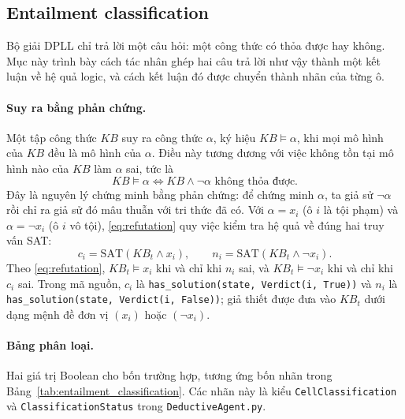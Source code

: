 \subsection{Entailment classification}
\label{sec:entailment_classification}
\begin{sloppypar}

Bộ giải DPLL chỉ trả lời một câu hỏi: một công thức có thỏa được hay không.
Mục này trình bày cách tác nhân ghép hai câu trả lời như vậy thành một kết luận
về hệ quả logic, và cách kết luận đó được chuyển thành nhãn của từng ô.

\paragraph{Suy ra bằng phản chứng.}
Một tập công thức $\mathit{KB}$ suy ra công thức $\alpha$, ký hiệu
$\mathit{KB} \models \alpha$, khi mọi mô hình của $\mathit{KB}$ đều là mô hình
của $\alpha$. Điều này tương đương với việc không tồn tại mô hình nào của
$\mathit{KB}$ làm $\alpha$ sai, tức là
\begin{equation}
  \mathit{KB} \models \alpha
  \iff
  \mathit{KB} \land \neg\alpha \text{ không thỏa được}.
  \label{eq:refutation}
\end{equation}
Đây là nguyên lý chứng minh bằng phản chứng: để chứng minh $\alpha$, ta giả sử
$\neg\alpha$ rồi chỉ ra giả sử đó mâu thuẫn với tri thức đã có. Với
$\alpha = x_i$ (ô $i$ là tội phạm) và $\alpha = \neg x_i$ (ô $i$ vô tội),
\eqref{eq:refutation} quy việc kiểm tra hệ quả về đúng hai truy vấn SAT:
\begin{equation}
  c_i = \mathrm{SAT}(\mathit{KB}_t \land x_i),
  \qquad
  n_i = \mathrm{SAT}(\mathit{KB}_t \land \neg x_i).
  \label{eq:two_queries}
\end{equation}
Theo \eqref{eq:refutation}, $\mathit{KB}_t \models x_i$ khi và chỉ khi
$n_i$ sai, và $\mathit{KB}_t \models \neg x_i$ khi và chỉ khi $c_i$ sai. Trong
mã nguồn, $c_i$ là \texttt{has\_solution(state, Verdict(i, True))} và $n_i$ là
\texttt{has\_solution(state, Verdict(i, False))}; giả thiết được đưa vào
$\mathit{KB}_t$ dưới dạng mệnh đề đơn vị $(x_i)$ hoặc $(\neg x_i)$.

\paragraph{Bảng phân loại.}
Hai giá trị Boolean cho bốn trường hợp, tương ứng bốn nhãn trong
Bảng~\ref{tab:entailment_classification}. Các nhãn này là kiểu
\texttt{CellClassification} và \texttt{ClassificationStatus} trong
\texttt{DeductiveAgent.py}.


\end{sloppypar}
